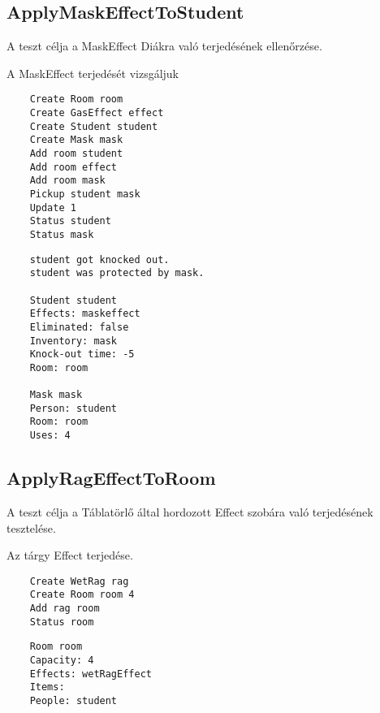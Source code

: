 \subsection{ApplyMaskEffectToStudent}
\begin{test-case-description}
    A teszt célja a MaskEffect Diákra való terjedésének ellenőrzése.
\end{test-case-description}
\begin{test-case-function}
    A MaskEffect terjedését vizsgáljuk
\end{test-case-function}
\begin{test-case-input}
    \begin{verbatim}
    Create Room room 
    Create GasEffect effect
    Create Student student
    Create Mask mask
    Add room student
    Add room effect
    Add room mask
    Pickup student mask
    Update 1
    Status student
    Status mask
    \end{verbatim}
\end{test-case-input}
\begin{test-case-output}
    \begin{verbatim}
    student got knocked out.
    student was protected by mask.
    
    Student student
    Effects: maskeffect
    Eliminated: false
    Inventory: mask
    Knock-out time: -5
    Room: room

    Mask mask
    Person: student
    Room: room
    Uses: 4
    \end{verbatim}
\end{test-case-output}

\subsection{ApplyRagEffectToRoom}
\begin{test-case-description}
    A teszt célja a Táblatörlő által hordozott Effect szobára való terjedésének tesztelése.
\end{test-case-description}
\begin{test-case-function}
    Az tárgy Effect terjedése.
\end{test-case-function}
\begin{test-case-input}
    \begin{verbatim}
    Create WetRag rag
    Create Room room 4
    Add rag room
    Status room
    \end{verbatim}
\end{test-case-input}
\begin{test-case-output}
    \begin{verbatim}
    Room room
    Capacity: 4
    Effects: wetRagEffect
    Items:
    People: student
    \end{verbatim}
\end{test-case-output}

